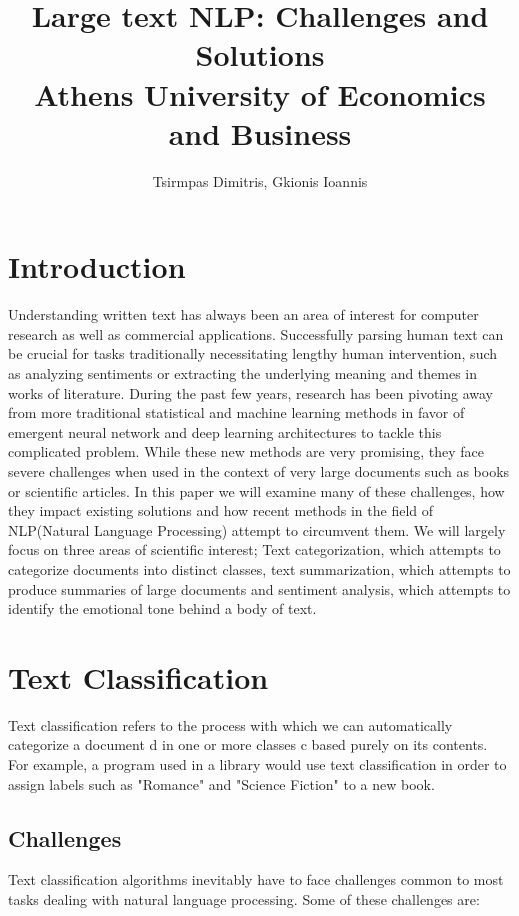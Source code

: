 \documentclass{article}
\title{Large text NLP: Challenges and Solutions\\\large Athens University of Economics and Business}
\author{Tsirmpas Dimitris, Gkionis Ioannis}
\begin{document}
	
	\begin{titlepage}
		\hypersetup{pageanchor=false} %
		\maketitle
	\end{titlepage}
	\hypersetup{pageanchor=true}
	
	\section{Introduction}
	Understanding written text has always been an area of interest for computer research as well as commercial applications. Successfully parsing human text can be crucial for tasks traditionally necessitating lengthy human intervention, such as analyzing sentiments or extracting the underlying meaning and themes in works of literature. During the past few years, research has been pivoting away from more traditional statistical and machine learning methods in favor of emergent neural network and deep learning architectures to tackle this complicated problem. While these new methods are very promising, they face severe challenges when used in the context of very large documents such as books or scientific articles. In this paper we will examine many of these challenges, how they impact existing solutions and how recent methods in the field of NLP(Natural Language Processing) attempt to circumvent them. We will largely focus on three areas of scientific interest; Text categorization, which attempts to categorize documents into distinct classes, text summarization, which attempts to produce summaries of large documents and sentiment analysis, which attempts to identify the emotional tone behind a body of text. 
	
	
	\section{Text Classification}
	Text classification refers to the process with which we can automatically categorize a document d in one or more classes c based purely on its contents. For example, a program used in a library would use text classification in order to assign labels such as "Romance" and "Science Fiction" to a new book.\par
	
	\subsection{Challenges}
	Text classification algorithms inevitably have to face challenges common to most tasks dealing with natural language processing. Some of these challenges are:
	
\end{document}
